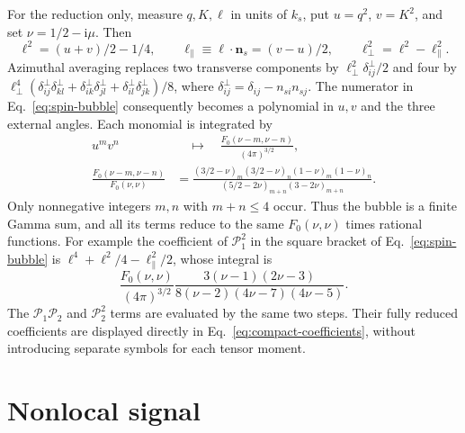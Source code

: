 \documentclass[a4paper,12pt]{article}
\newcommand{\ii}{\mathrm i}
\begin{document}
For the reduction only, measure $q,K,\ell$ in units of $k_s$, put
$u=q^2$, $v=K^2$, and set $\nu=1/2-\ii\mu$. Then
\begin{equation}
 \ell^2=(u+v)/2-1/4,\qquad
 \ell_\parallel\equiv\bm\ell\cdot\bm n_s=(v-u)/2,\qquad
 \ell_\perp^2=\ell^2-\ell_\parallel^2.
\end{equation}
Azimuthal averaging replaces two transverse components by
$\ell_\perp^2\delta^\perp_{ij}/2$ and four by
$\ell_\perp^4(\delta^\perp_{ij}\delta^\perp_{kl}
+\delta^\perp_{ik}\delta^\perp_{jl}+\delta^\perp_{il}\delta^\perp_{jk})/8$,
where $\delta^\perp_{ij}=\delta_{ij}-n_{s i}n_{s j}$.
The numerator in Eq.~\eqref{eq:spin-bubble} consequently becomes a polynomial
in $u,v$ and the three external angles. Each monomial is integrated by
\begin{align}
 u^mv^n&\quad\longmapsto\quad
 \frac{F_0(\nu-m,\nu-n)}{(4\pi)^{3/2}},\\
 \frac{F_0(\nu-m,\nu-n)}{F_0(\nu,\nu)}&=
 \frac{(3/2-\nu)_m(3/2-\nu)_n(1-\nu)_m(1-\nu)_n}
 {(5/2-2\nu)_{m+n}(3-2\nu)_{m+n}}.
 \label{eq:bubble-reduction}
\end{align}
Only nonnegative integers $m,n$ with $m+n\leq4$ occur. Thus the bubble is a
finite Gamma sum, and all its terms reduce to the same $F_0(\nu,\nu)$ times
rational functions. For example the coefficient of $\mathcal P_1^2$ in the
square bracket of Eq.~\eqref{eq:spin-bubble} is
$\ell^4+\ell^2/4-\ell_\parallel^2/2$, whose integral is
\begin{equation}
 \frac{F_0(\nu,\nu)}{(4\pi)^{3/2}}
 \frac{3(\nu-1)(2\nu-3)}{8(\nu-2)(4\nu-7)(4\nu-5)}.
\end{equation}
The $\mathcal P_1\mathcal P_2$ and $\mathcal P_2^2$ terms are evaluated by
the same two steps. Their fully reduced coefficients are displayed directly
in Eq.~\eqref{eq:compact-coefficients}, without introducing separate symbols
for each tensor moment.

\section{Nonlocal signal}
\end{document}

